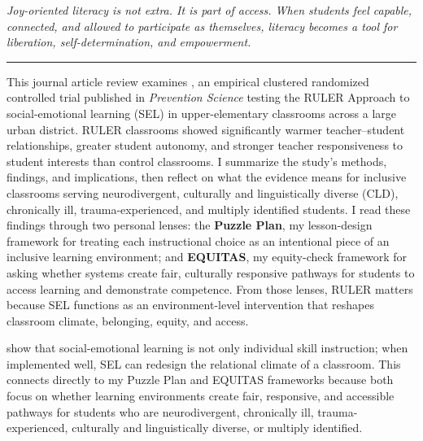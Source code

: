 \documentclass[11pt]{article}
\newcommand{\reviewsection}[1]{\vspace{0.07in}\noindent{\normalsize\bfseries\color{PrimaryRed}#1}\par\vspace{0.02in}}
\begin{document}
\begin{titlepage}
\vfill

\begin{center}
\begin{minipage}{0.92\textwidth}
\centering\footnotesize
\itshape
Joy-oriented literacy is not extra. It is part of access. When students feel capable, connected, and allowed to participate as themselves, literacy becomes a tool for liberation, self-determination, and empowerment.
{\color{PrimaryRed}\rule{4in}{0.5pt}}
\end{minipage}
\end{center}

\vfill

\begin{center}
\begin{minipage}{1.0\textwidth}
\small
This journal article review examines \citet{rivers2013ruler}, an empirical clustered
randomized controlled trial published in \textit{Prevention Science} testing the RULER
Approach to social-emotional learning (SEL) in upper-elementary classrooms across a large
urban district. RULER classrooms showed significantly warmer teacher--student relationships,
greater student autonomy, and stronger teacher responsiveness to student interests than
control classrooms. I summarize the study's methods, findings, and implications, then
reflect on what the evidence means for inclusive classrooms serving neurodivergent,
culturally and linguistically diverse (CLD), chronically ill, trauma-experienced, and
multiply identified students. I read these findings through two personal lenses: the
\textbf{Puzzle Plan}, my lesson-design framework for treating each instructional choice as
an intentional piece of an inclusive learning environment; and \textbf{EQUITAS}, my
equity-check framework for asking whether systems create fair, culturally responsive
pathways for students to access learning and demonstrate competence. From those lenses, RULER
matters because SEL functions as an environment-level intervention that reshapes classroom
climate, belonging, equity, and access.
\end{minipage}
\end{center}


\restoregeometry
\end{titlepage}

\reviewsection{Guiding Claim}
\citet{rivers2013ruler} show that social-emotional learning is not only individual skill instruction; when implemented well, SEL can redesign the relational climate of a classroom. This connects directly to my Puzzle Plan and EQUITAS frameworks because both focus on whether learning environments create fair, responsive, and accessible pathways for students who are neurodivergent, chronically ill, trauma-experienced, culturally and linguistically diverse, or multiply identified.
\end{document}
